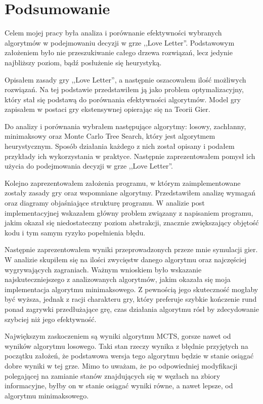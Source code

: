 \chapter{Podsumowanie}
\label{cha:rozdz6}

Celem mojej pracy była analiza i porównanie efektywności wybranych algorytmów w podejmowaniu decyzji w grze ,,Love Letter''. Podstawowym założeniem było nie przeszukiwanie całego drzewa rozwiązań, lecz jedynie najbliższy poziom, bądź posłużenie się heurystyką.

Opisałem zasady gry ,,Love Letter'', a następnie oszacowałem ilość możliwych rozwiązań. Na tej podstawie przedstawiłem ją jako problem optymalizacyjny, który stał się podstawą do porównania efektywności algorytmów. Model gry zapisałem w postaci gry ekstensywnej opierając się na Teorii Gier.

Do analizy i porównania wybrałem następujące algorytmy: losowy, zachłanny, minimaksowy oraz Monte Carlo Tree Search, który jest algorytmem heurystycznym. Sposób działania każdego z nich został opisany i podałem przykłady ich wykorzystania w praktyce. Następnie zaprezentowałem pomysł ich użycia do podejmowania decyzji w grze ,,Love Letter''.

Kolejno zaprezentowałem założenia programu, w którym zaimplementowane zostały zasady gry oraz wspomniane algorytmy. Przedstawiłem analizę wymagań oraz diagramy objaśniające strukturę programu. W analizie post implementacyjnej wskazałem główny problem związany z napisaniem programu, jakim okazał się niedostateczny poziom abstrakcji, znacznie zwiększający objętość kodu i tym samym ryzyko popełnienia błędu.

Następnie zaprezentowałem wyniki przeprowadzonych przeze mnie symulacji gier. W analizie skupiłem się na ilości zwycięstw danego algorytmu oraz najczęściej wygrywających zagraniach. Ważnym wnioskiem było wskazanie najskuteczniejszego z analizowanych algorytmów, jakim okazała się moja implementacja algorytmu minimaksowego. Z pewnością jego skuteczność mogłaby być wyższa, jednak z racji charakteru gry, który preferuje szybkie kończenie rund ponad zagrywki przedłużające grę, czas działania algorytmu rósł by zdecydowanie szybciej niż jego efektywność. 

Największym zaskoczeniem są wyniki algorytmu MCTS, gorsze nawet od wyników algorytmu losowego. Taki stan rzeczy wynika z błędnie przyjętych na początku założeń, że podstawowa wersja tego algorytmu będzie w stanie osiągać dobre wyniki w tej grze. Mimo to uważam, że po odpowiedniej modyfikacji polegającej na zamianie stanów znajdujących się w węzłach na zbiory informacyjne, byłby on w stanie osiągać wyniki równe, a nawet lepsze, od algorytmu minimaksowego.